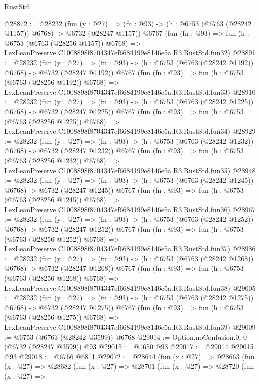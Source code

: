 \begin{lexlean}{RustStd}
\begin{coremodule}
@28872 := @28232
    (fun (y : @27) =>
    (fn : @93) -> (h : @6753 (@6763 (@28242 @1157)) @6768) -> @6732 (@28247 @1157))
    @6767
    (fun (fn : @93) =>
    fun (h : @6753 (@6763 (@28256 @1157)) @6768) =>
    LexLeanPreserve.C1008898f8704347ef6684199e8146e5a.R3.RustStd.fun32)
@28891 := @28232
    (fun (y : @27) =>
    (fn : @93) -> (h : @6753 (@6763 (@28242 @1192)) @6768) -> @6732 (@28247 @1192))
    @6767
    (fun (fn : @93) =>
    fun (h : @6753 (@6763 (@28256 @1192)) @6768) =>
    LexLeanPreserve.C1008898f8704347ef6684199e8146e5a.R3.RustStd.fun33)
@28910 := @28232
    (fun (y : @27) =>
    (fn : @93) -> (h : @6753 (@6763 (@28242 @1225)) @6768) -> @6732 (@28247 @1225))
    @6767
    (fun (fn : @93) =>
    fun (h : @6753 (@6763 (@28256 @1225)) @6768) =>
    LexLeanPreserve.C1008898f8704347ef6684199e8146e5a.R3.RustStd.fun34)
@28929 := @28232
    (fun (y : @27) =>
    (fn : @93) -> (h : @6753 (@6763 (@28242 @1232)) @6768) -> @6732 (@28247 @1232))
    @6767
    (fun (fn : @93) =>
    fun (h : @6753 (@6763 (@28256 @1232)) @6768) =>
    LexLeanPreserve.C1008898f8704347ef6684199e8146e5a.R3.RustStd.fun35)
@28948 := @28232
    (fun (y : @27) =>
    (fn : @93) -> (h : @6753 (@6763 (@28242 @1245)) @6768) -> @6732 (@28247 @1245))
    @6767
    (fun (fn : @93) =>
    fun (h : @6753 (@6763 (@28256 @1245)) @6768) =>
    LexLeanPreserve.C1008898f8704347ef6684199e8146e5a.R3.RustStd.fun36)
@28967 := @28232
    (fun (y : @27) =>
    (fn : @93) -> (h : @6753 (@6763 (@28242 @1252)) @6768) -> @6732 (@28247 @1252))
    @6767
    (fun (fn : @93) =>
    fun (h : @6753 (@6763 (@28256 @1252)) @6768) =>
    LexLeanPreserve.C1008898f8704347ef6684199e8146e5a.R3.RustStd.fun37)
@28986 := @28232
    (fun (y : @27) =>
    (fn : @93) -> (h : @6753 (@6763 (@28242 @1268)) @6768) -> @6732 (@28247 @1268))
    @6767
    (fun (fn : @93) =>
    fun (h : @6753 (@6763 (@28256 @1268)) @6768) =>
    LexLeanPreserve.C1008898f8704347ef6684199e8146e5a.R3.RustStd.fun38)
@29005 := @28232
    (fun (y : @27) =>
    (fn : @93) -> (h : @6753 (@6763 (@28242 @1275)) @6768) -> @6732 (@28247 @1275))
    @6767
    (fun (fn : @93) =>
    fun (h : @6753 (@6763 (@28256 @1275)) @6768) =>
    LexLeanPreserve.C1008898f8704347ef6684199e8146e5a.R3.RustStd.fun39)
@29009 := @6753 (@6763 (@28242 @3599)) @6768
@29014 := Option.noConfusion.{0, 0} (@6732 (@28247 @3599)) @93
@29015 := @1650 @93
@29017 := @29014 @29015 @93
@29018 := @6766 @6811
@29072 := @28644
    (fun (x : @27) =>
    @28663
      (fun (x : @27) =>
      @28682
        (fun (x : @27) =>
        @28701
          (fun (x : @27) =>
          @28720
            (fun (x : @27) =>

\end{coremodule}
\end{lexlean}
